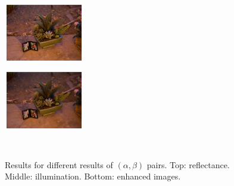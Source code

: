 \begin{figure}[tb]
\begin{minipage}[b]{0.24\hsize}
			 \label{fig:parameter/qualitative/0001-001}
	\end{minipage}
	\begin{minipage}[b]{0.24\hsize}
			\centering
			\includegraphics[width=35mm, height = 25mm]{images/experiment/parameter/output/0.01-0.001.eps}
			 \label{fig:parameter/qualitative/001-0001}
	\end{minipage}
	\begin{minipage}[b]{0.24\hsize}
			\centering
			\includegraphics[width=35mm, height = 25mm]{images/experiment/parameter/output/0.01-0.01.eps}
			 \label{fig:parameter/qualitative/001-001}
	\end{minipage}\\
	\caption{Results for different results of $(\alpha, \beta)$ pairs. Top: reflectance. Middle: illumination. Bottom: enhanced images.}
	\label{fig:parameter/qualitative}
\end{figure}
